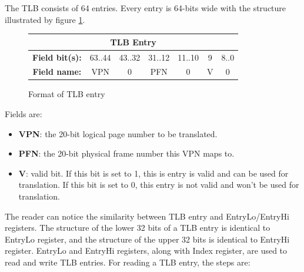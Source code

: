 \documentclass[]{scrartcl}
\begin{document}
The TLB consists of 64 entries. Every entry is 64-bits wide
with the structure illustrated by figure \ref{tlb_entry}.

\begin{figure}[H]
\begin{center}
\begin{tabular}{|c|c|c|c|c|c|c|}

\hline \multicolumn{7}{|c|}{TLB Entry} \\

\hline \textbf{Field bit(s):} & 63..44 & 43..32 & 31..12 & 11..10 & 9 & 8..0 \\

\hline \textbf{Field name:}   & VPN    & 0      & PFN    & 0      & V & 0    \\

\hline

\end{tabular}

\end{center}
\caption{Format of TLB entry}
\label{tlb_entry}
\end{figure}

Fields are:

\begin{itemize}

\item \textbf{VPN}: the 20-bit logical page number to be translated.

\item \textbf{PFN}: the 20-bit physical frame number this VPN maps to.

\item \textbf{V}: valid bit. If this bit is set to 1, this is entry
      is valid and can be used for translation. If this bit is set to
      0, this entry is not valid and won't be used for translation.

\end{itemize}

The reader can notice the similarity between TLB entry and EntryLo/EntryHi
registers. The structure of the lower 32 bits of a TLB entry is identical
to EntryLo register, and the structure of the upper 32 bits is identical
to EntryHi register. EntryLo and EntryHi registers, along with Index
register, are used to read and write TLB entries. For reading a TLB
entry, the steps are:
\end{document}
